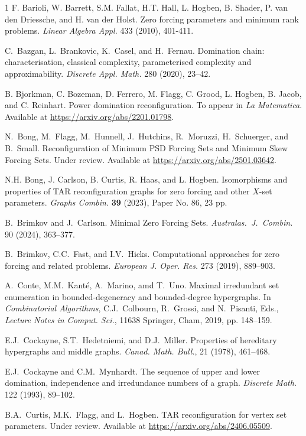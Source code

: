 \documentclass{article}
\numberwithin{figure}{section}
\numberwithin{table}{section}
\numberwithin{equation}{section}
\theoremstyle{definition}
\theoremstyle{definition}
\theoremstyle{definition}
\begin{document}
{\begin{thebibliography}{1}
 F. Barioli, W. Barrett, S.M. Fallat, H.T. Hall, L. Hogben, B. Shader, P. van den Driessche, and H. van der Holst.  Zero forcing parameters and minimum rank problems. {\it{Linear Algebra Appl.}} {433} (2010), 401-411.


C.~Bazgan, L.~Brankovic, K.~Casel, and H.~Fernau.  Domination chain: characterisation, classical complexity, parameterised complexity and approximability.
\emph{Discrete Appl. Math.} 280 (2020), 23--42.


 B. Bjorkman, C. Bozeman, D. Ferrero, M. Flagg, C. Grood, L. Hogben, B. Jacob, and C. Reinhart.  Power domination reconfiguration.  To appear in \emph{La Matematica}.  Available at \url{https://arxiv.org/abs/2201.01798}.

 N.~Bong, M.~Flagg, M.~Hunnell, J.~Hutchins, R.~Moruzzi, H.~Schuerger, and B.~Small. Reconfiguration of Minimum PSD Forcing Sets and Minimum Skew Forcing Sets. Under review.  Available at \url{https://arxiv.org/abs/2501.03642}.

 N.H. Bong, J. Carlson, B. Curtis, R. Haas, and L. Hogben. Isomorphisms  and  properties of TAR reconfiguration graphs for zero forcing and other $X$-set parameters.  \emph{Graphs Combin.} {\bf 39} (2023), Paper No. 86, 23 pp. 

  B.~Brimkov and J.~Carlson. Minimal Zero Forcing Sets. \emph{
Australas.~J.~Combin.} 90 (2024), 363–377.

 B.~Brimkov, C.C.~Fast, and I.V.~Hicks. Computational approaches for zero forcing and related problems. \emph{European J. Oper. Res.} 273 (2019),  889--903.


A.~Conte, M.M.~Kanté, A.~Marino, amd T.~Uno.
Maximal irredundant set enumeration in bounded-degeneracy and bounded-degree hypergraphs.
In \emph{Combinatorial
Algorithms}, C.J.~Colbourn,
R.~Grossi, and 
N.~Pisanti, Eds., \emph{Lecture Notes in Comput. Sci.}, 11638
Springer, Cham, 2019, pp. 148–159.

  E.J.~Cockayne, S.T.~Hedetniemi, and D.J.~Miller.
Properties of hereditary hypergraphs and middle graphs.
\emph{Canad. Math. Bull.}, 21 (1978), 461--468.

 E.J.~Cockayne and C.M.~Mynhardt. The sequence of upper and lower domination, independence
and irredundance numbers of a graph. \emph{Discrete Math.} 122 (1993), 89--102.

 B.A.~Curtis, M.K.~Flagg, and L.~Hogben. TAR reconfiguration for vertex set parameters. Under review.  Available at \url{https://arxiv.org/abs/2406.05509}.


\end{thebibliography}}
\end{document}
